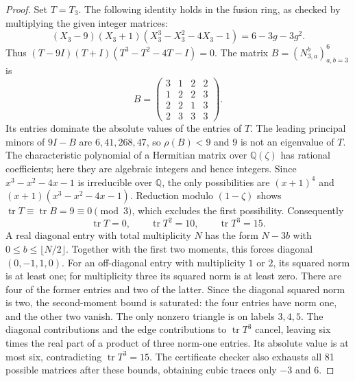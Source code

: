 \begin{proof}
Set $T=T_3$. The following identity holds in the fusion ring, as checked
by multiplying the given integer matrices:
\[
 (X_3-9)(X_3+1)(X_3^3-X_3^2-4X_3-1)=6-3g-3g^2.
\]
Thus $(T-9I)(T+I)(T^3-T^2-4T-I)=0$.
The matrix $B=(N_{3,a}^{b})_{a,b=3}^6$ is
\[
 B=\begin{pmatrix}3&1&2&2\\1&2&2&3\\2&2&1&3\\2&3&3&3\end{pmatrix}.
\]
Its entries dominate the absolute values of the entries of $T$.
The leading principal minors of $9I-B$ are $6,41,268,47$, so
$\rho(B)<9$ and $9$ is not an eigenvalue of $T$.
The characteristic polynomial of a Hermitian matrix over
$\mathbb Q(\zeta)$ has rational coefficients; here they are algebraic
integers and hence integers. Since $x^3-x^2-4x-1$ is irreducible over
$\mathbb Q$, the only possibilities are $(x+1)^4$ and
$(x+1)(x^3-x^2-4x-1)$. Reduction modulo $(1-\zeta)$ shows
$\operatorname{tr}T\equiv\operatorname{tr}B=9\equiv0\pmod3$,
which excludes the first possibility. Consequently
\[
 \operatorname{tr}T=0,\qquad \operatorname{tr}T^2=10,
 \qquad \operatorname{tr}T^3=15.
\]
A real diagonal entry with total multiplicity $N$ has the form $N-3b$
with $0\le b\le\lfloor N/2\rfloor$. Together with the first two
moments, this forces diagonal $(0,-1,1,0)$. For an off-diagonal entry
with multiplicity $1$ or $2$, its squared norm is at least one; for
multiplicity three its squared norm is at least zero. There are four
of the former entries and two of the latter. Since the diagonal
squared norm is two, the second-moment bound is saturated: the four
entries have norm one, and the other two vanish. The only nonzero
triangle is on labels $3,4,5$. The diagonal contributions and the
edge contributions to $\operatorname{tr}T^3$ cancel, leaving six times
the real part of a product of three norm-one entries. Its absolute
value is at most six, contradicting $\operatorname{tr}T^3=15$.
The certificate checker also exhausts all 81 possible matrices after
these bounds, obtaining cubic traces only $-3$ and $6$.

\end{proof}
